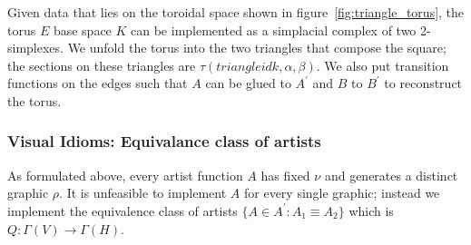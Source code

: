 \documentclass[../main.tex]{subfiles}
\begin{document}
Given data that lies on the toroidal space shown in figure~\ref{fig:triangle_torus}, the torus $E$ base space $K$ can be implemented as a simplacial complex of two 2-simplexes. We unfold the torus into the two triangles that compose the square; the sections on these triangles are $\tau(triangle id k, \alpha, \beta)$. We also put transition functions on the edges such that $A$ can be glued to $A^\prime$ and $B$ to $B^\prime$ to reconstruct the torus. 

\subsubsection{Visual Idioms: Equivalance class of artists}
As formulated above, every artist function $A$ has fixed $\nu$ and generates a distinct graphic $\rho$. It is unfeasible to implement $A$ for every single graphic; instead we implement the equivalence class of artists $\{A \in A^\prime: A_{1} \equiv A_{2}\}$ which is $Q:\Gamma(V) \rightarrow \Gamma(H)$. 

\end{document}
